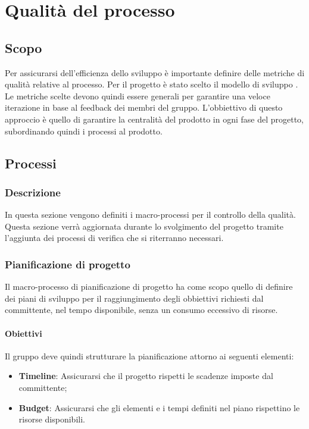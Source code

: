 \section{Qualità del processo}

\subsection{Scopo}
Per assicurarsi dell'efficienza dello sviluppo è importante definire delle metriche di qualità relative al processo.
Per il progetto è stato scelto il modello di sviluppo .
Le metriche scelte devono quindi essere generali per garantire una veloce iterazione in base al feedback dei membri del gruppo.
L'obbiettivo di questo approccio è quello di garantire la centralità del prodotto in ogni fase del progetto, subordinando quindi i processi al prodotto.

\subsection{Processi}
\subsubsection{Descrizione}
In questa sezione vengono definiti i macro-processi per il controllo della qualità.
Questa sezione verrà aggiornata durante lo svolgimento del progetto tramite l'aggiunta dei processi di verifica che si riterranno necessari.

\subsubsection{Pianificazione di progetto}
Il macro-processo di pianificazione di progetto ha come scopo quello di definire dei piani di sviluppo per il raggiungimento degli obbiettivi richiesti dal committente, nel tempo disponibile, senza un consumo eccessivo di risorse.

\paragraph{Obiettivi}
Il gruppo deve quindi strutturare la pianificazione attorno ai seguenti elementi:
\begin{itemize}
\item \textbf{Timeline}: Assicurarsi che il progetto rispetti le scadenze imposte dal committente;
\item \textbf{Budget}: Assicurarsi che gli elementi e i tempi definiti nel piano rispettino le risorse disponibili.
\end{itemize}

